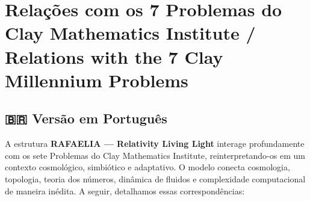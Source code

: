 

\section{Relações com os 7 Problemas do Clay Mathematics Institute / Relations with the 7 Clay Millennium Problems}

\subsection*{🇧🇷 Versão em Português}

A estrutura \textbf{RAFAELIA — Relativity Living Light} interage profundamente com os sete Problemas do Clay Mathematics Institute, reinterpretando-os em um contexto cosmológico, simbiótico e adaptativo. O modelo conecta cosmologia, topologia, teoria dos números, dinâmica de fluidos e complexidade computacional de maneira inédita. A seguir, detalhamos essas correspondências:

